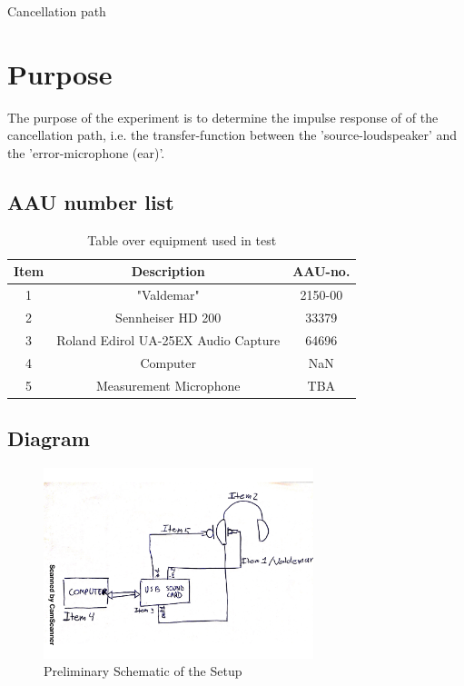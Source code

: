 \documentclass[12pt,a4paper,openright]{article}
\newcommand{\ra}[1]{\renewcommand{\arraystretch}{#1}}
\begin{document}
\begin{Huge}
\begin{center}
Cancellation path
\end{center}
\end{Huge}

\section{Purpose}
The purpose of the experiment is to determine the impulse response of of the cancellation path, i.e. the transfer-function between the 'source-loudspeaker' and the 'error-microphone (ear)'.
		
\subsection{AAU number list}
\begin{table}[h]
	\centering
	\ra{1.3}
	\begin{tabular}{ c c c } \toprule
		{Item} & {Description} & {AAU-no}. \\ \bottomrule 
		1      &  "Valdemar"							& 2150-00	\\
		2      &  Sennheiser HD 200						& 33379		\\
		3      &  Roland Edirol UA-25EX Audio Capture	& 64696		\\
		4      &  Computer								& NaN		\\  
		5      &  Measurement Microphone				& TBA		\\ \bottomrule 
	\end{tabular}
	\caption{Table over equipment used in test}
	\label{tab:UsedEquipmentListning1}
\end{table}

\subsection{Diagram}
\begin{figure}[H]
	\centering
	\includegraphics[width=0.7\textwidth]{Schem.png}
	\caption{Preliminary Schematic of the Setup}
	\label{Schematic}
\end{figure}
\end{document}
